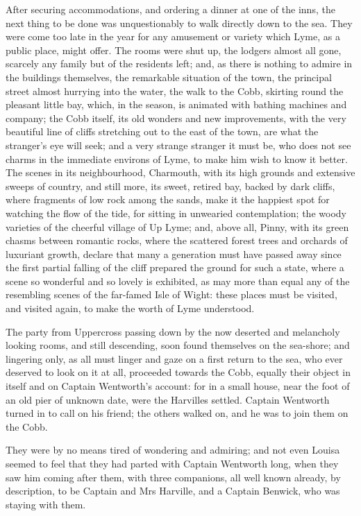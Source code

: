 After securing accommodations, and ordering a dinner at one of the inns, the next thing to be done was unquestionably to walk directly down to the sea. They were come too late in the year for any amusement or variety which Lyme, as a public place, might offer. The rooms were shut up, the lodgers almost all gone, scarcely any family but of the residents left; and, as there is nothing to admire in the buildings themselves, the remarkable situation of the town, the principal street almost hurrying into the water, the walk to the Cobb, skirting round the pleasant little bay, which, in the season, is animated with bathing machines and company; the Cobb itself, its old wonders and new improvements, with the very beautiful line of cliffs stretching out to the east of the town, are what the stranger's eye will seek; and a very strange stranger it must be, who does not see charms in the immediate environs of Lyme, to make him wish to know it better. The scenes in its neighbourhood, Charmouth, with its high grounds and extensive sweeps of country, and still more, its sweet, retired bay, backed by dark cliffs, where fragments of low rock among the sands, make it the happiest spot for watching the flow of the tide, for sitting in unwearied contemplation; the woody varieties of the cheerful village of Up Lyme; and, above all, Pinny, with its green chasms between romantic rocks, where the scattered forest trees and orchards of luxuriant growth, declare that many a generation must have passed away since the first partial falling of the cliff prepared the ground for such a state, where a scene so wonderful and so lovely is exhibited, as may more than equal any of the resembling scenes of the far-famed Isle of Wight: these places must be visited, and visited again, to make the worth of Lyme understood.

The party from Uppercross passing down by the now deserted and melancholy looking rooms, and still descending, soon found themselves on the sea-shore; and lingering only, as all must linger and gaze on a first return to the sea, who ever deserved to look on it at all, proceeded towards the Cobb, equally their object in itself and on Captain Wentworth's account: for in a small house, near the foot of an old pier of unknown date, were the Harvilles settled. Captain Wentworth turned in to call on his friend; the others walked on, and he was to join them on the Cobb.

They were by no means tired of wondering and admiring; and not even Louisa seemed to feel that they had parted with Captain Wentworth long, when they saw him coming after them, with three companions, all well known already, by description, to be Captain and Mrs Harville, and a Captain Benwick, who was staying with them.

